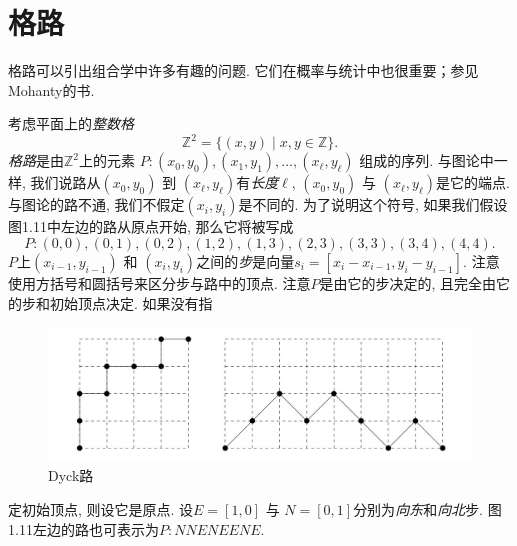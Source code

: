 \documentclass{ctexbook}
\begin{document}
\section{格路}
格路可以引出组合学中许多有趣的问题. 它们在概率与统计中也很重要；参见Mohanty的书.

考虑平面上的\textsl{整数格}
$$
\mathbb{Z}^{2}=\{(x, y) \mid x, y \in \mathbb{Z}\}.
$$
\textsl{格路}是由$\mathbb{Z}^{2}$上的元素 $P:\left(x_{0}, y_{0}\right),\left(x_{1}, y_{1}\right), \ldots,\left(x_{\ell}, y_{\ell}\right) $
组成的序列. 与图论中一样, 我们说路从$\left(x_{0}, y_{0}\right)$ 到 $\left(x_{\ell}, y_{\ell}\right)$有\textsl{长度}$\ell$,
$\left(x_{0}, y_{0}\right)$ 与 $\left(x_{\ell}, y_{\ell}\right)$是它的端点. 与图论的路不通, 我们不假定$\left(x_{i}, y_{i}\right)$是不同的.
为了说明这个符号, 如果我们假设图1.11中左边的路从原点开始, 那么它将被写成
$$
P:(0,0),(0,1),(0,2),(1,2),(1,3),(2,3),(3,3),(3,4),(4,4).
$$
$P$上$\left(x_{i-1}, y_{i-1}\right)$ 和 $\left(x_{i}, y_{i}\right)$之间的\textsl{步}是向量$s_{i}=\left[x_{i}-x_{i-1}, y_{i}-y_{i-1}\right]$.
注意使用方括号和圆括号来区分步与路中的顶点. 注意$P$是由它的步决定的, 且完全由它的步和初始顶点决定. 如果没有指


\begin{figure}
    \centering
    \includegraphics[scale=0.3]{./fig1/figure1.11.PNG}
    \caption{Dyck路}
\end{figure}


\noindent
定初始顶点, 则设它是原点. 设$E=[1,0]$ 与 $N=[0,1]$分别为\textsl{向东}和\textsl{向北}步. 图1.11左边的路也可表示为$P: N N E N E E N E$.
\end{document}
